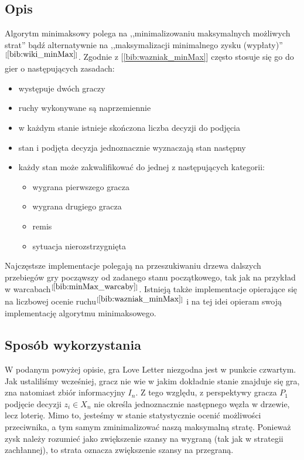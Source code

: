 \subsection{Opis}
Algorytm minimaksowy polega na ,,minimalizowaniu maksymalnych możliwych strat'' bądź alternatywnie na ,,maksymalizacji minimalnego zysku (wypłaty)''$^{[\ref{bib:wiki_minMax}]}$. Zgodnie z [\ref{bib:wazniak_minMax}] często stosuje się go do gier o następujących zasadach:
\begin{itemize}
	\item występuje dwóch graczy
	\item ruchy wykonywane są naprzemiennie
	\item w każdym stanie istnieje skończona liczba decyzji do podjęcia
	\item stan i podjęta decyzja jednoznacznie wyznaczają stan następny
	\item każdy stan może zakwalifikować do jednej z następujących kategorii:
	\begin{itemize}
		\item wygrana pierwszego gracza
		\item wygrana drugiego gracza
		\item remis
		\item sytuacja nierozstrzygnięta
	\end{itemize}
\end{itemize}
Najczęstsze implementacje polegają na przeszukiwaniu drzewa dalszych przebiegów gry począwszy od zadanego stanu początkowego, tak jak na przykład w warcabach$^{[\ref{bib:minMax_warcaby}]}$. Istnieją także implementacje opierające się na liczbowej ocenie ruchu$^{[\ref{bib:wazniak_minMax}]}$ i na tej idei opieram swoją implementację algorytmu minimaksowego.

\subsection{Sposób wykorzystania}
W podanym powyżej opisie, gra Love Letter niezgodna jest w punkcie czwartym. Jak ustaliliśmy wcześniej, gracz nie wie w jakim dokładnie stanie znajduje się gra, zna natomiast zbiór informacyjny $I_n$. Z tego względu, z perspektywy gracza $P_1$ podjęcie decyzji $z_i \in X_n$ nie określa jednoznacznie następnego węzła w drzewie, lecz loterię. Mimo to, jesteśmy w stanie statystycznie ocenić możliwości przeciwnika, a tym samym zminimalizować naszą maksymalną stratę. Ponieważ zysk należy rozumieć jako zwiększenie szansy na wygraną (tak jak w strategii zachłannej), to strata oznacza zwiększenie szansy na przegraną. 

